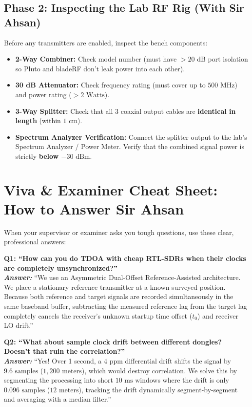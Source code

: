 \documentclass[11pt,a4paper]{article}
\begin{document}
\subsection{Phase 2: Inspecting the Lab RF Rig (With Sir Ahsan)}
Before any transmitters are enabled, inspect the bench components:
\begin{itemize}[leftmargin=*]
    \item \textbf{2-Way Combiner:} Check model number (must have $>20\text{ dB}$ port isolation so Pluto and bladeRF don't leak power into each other).
    \item \textbf{30 dB Attenuator:} Check frequency rating (must cover up to $500\text{ MHz}$) and power rating ($> 2\text{ Watts}$).
    \item \textbf{3-Way Splitter:} Check that all 3 coaxial output cables are \textbf{identical in length} (within $1\text{ cm}$).
    \item \textbf{Spectrum Analyzer Verification:} Connect the splitter output to the lab's Spectrum Analyzer / Power Meter. Verify that the combined signal power is strictly \textbf{below $-30\text{ dBm}$}.
\end{itemize}

\section{Viva \& Examiner Cheat Sheet: How to Answer Sir Ahsan}

When your supervisor or examiner asks you tough questions, use these clear, professional answers:

\vspace{0.2cm}
\noindent\textbf{Q1: ``How can you do TDOA with cheap RTL-SDRs when their clocks are completely unsynchronized?''}\\
\textit{\textbf{Answer:}} ``We use an Asymmetric Dual-Offset Reference-Assisted architecture. We place a stationary reference transmitter at a known surveyed position. Because both reference and target signals are recorded simultaneously in the same baseband buffer, subtracting the measured reference lag from the target lag completely cancels the receiver's unknown startup time offset ($t_0$) and receiver LO drift.''

\vspace{0.2cm}
\noindent\textbf{Q2: ``What about sample clock drift between different dongles? Doesn't that ruin the correlation?''}\\
\textit{\textbf{Answer:}} ``Yes! Over 1 second, a $4\text{ ppm}$ differential drift shifts the signal by $9.6\text{ samples}$ ($1{,}200\text{ meters}$), which would destroy correlation. We solve this by segmenting the processing into short $10\text{ ms}$ windows where the drift is only $0.096\text{ samples}$ ($12\text{ meters}$), tracking the drift dynamically segment-by-segment and averaging with a median filter.''
\end{document}
